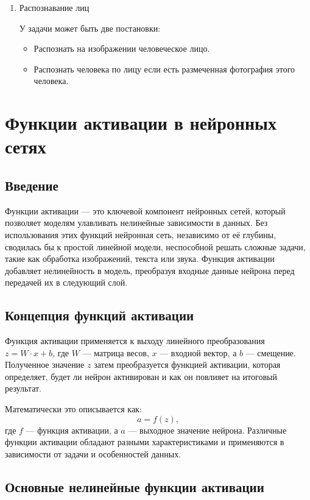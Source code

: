 {\begin{enumerate}
\item Распознавание лиц

У задачи может быть две постановки:
\begin{itemize}
\item Распознать на изображении человеческое лицо.
\item Распознать человека по лицу если есть размеченная фотография этого человека.
\end{itemize}
\end{enumerate}


\section*{Функции активации в нейронных сетях}

\subsection*{Введение}
Функции активации — это ключевой компонент нейронных сетей, который позволяет моделям улавливать нелинейные зависимости в данных. Без использования этих функций нейронная сеть, независимо от её глубины, сводилась бы к простой линейной модели, неспособной решать сложные задачи, такие как обработка изображений, текста или звука. Функция активации добавляет нелинейность в модель, преобразуя входные данные нейрона перед передачей их в следующий слой.

\subsection*{Концепция функций активации}
Функция активации применяется к выходу линейного преобразования $z = W \cdot x + b$, где $W$ — матрица весов, $x$ — входной вектор, а $b$ — смещение. Полученное значение $z$ затем преобразуется функцией активации, которая определяет, будет ли нейрон активирован и как он повлияет на итоговый результат.

Математически это описывается как:
\[
    a = f(z),
\]
где $f$ — функция активации, а $a$ — выходное значение нейрона. Различные функции активации обладают разными характеристиками и применяются в зависимости от задачи и особенностей данных.

\subsection*{Основные нелинейные функции активации}

}
